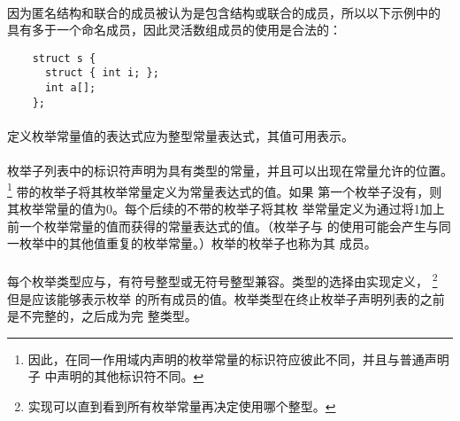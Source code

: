 {\paragraph{}
\ex 因为匿名结构和联合的成员被认为是包含结构或联合的成员，所以以下示例中的
具有多于一个命名成员，因此灵活数组成员的使用是合法的：
\begin{lstlisting}
    struct s {
      struct { int i; };
      int a[];
    };
\end{lstlisting}


\syntax
\paragraph{}

\constraint
\paragraph{}
定义枚举常量值的表达式应为整型常量表达式，其值可用表示。

\semantic
\paragraph{}
枚举子列表中的标识符声明为具有类型的常量，并且可以出现在常量允许的位置。
\footnote{因此，在同一作用域内声明的枚举常量的标识符应彼此不同，并且与普通声明子
中声明的其他标识符不同。} 带\tm{=}的枚举子将其枚举常量定义为常量表达式的值。如果
第一个枚举子没有\tm{=}，则其枚举常量的值为0。每个后续的不带\tm{=}的枚举子将其枚
举常量定义为通过将1加上前一个枚举常量的值而获得的常量表达式的值。（枚举子与
\tm{=}的使用可能会产生与同一枚举中的其他值重复的枚举常量。）枚举的枚举子也称为其
成员。

\paragraph{}
每个枚举类型应与，有符号整型或无符号整型兼容。类型的选择由实现定义，
\footnote{实现可以直到看到所有枚举常量再决定使用哪个整型。} 但是应该能够表示枚举
的所有成员的值。枚举类型在终止枚举子声明列表的\tm{\}}之前是不完整的，之后成为完
整类型。

}
